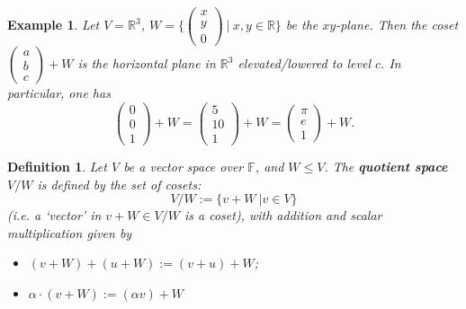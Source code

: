 \documentclass[12pt]{amsbook}
\newtheorem{definition}[theorem]{Definition}
\newtheorem{example}[theorem]{Example}
\begin{document}
\begin{example} \label{eg-xyplane}
    Let $V = \mathbb{R}^3$, $W = \{\begin{pmatrix} x \\ y \\ 0 \end{pmatrix}\ |\ x,y \in \mathbb{R}\}$ be the $xy$-plane. Then the coset
    $\begin{pmatrix} a \\ b \\ c \end{pmatrix} + W$ is the horizontal plane in $\mathbb{R}^3$ elevated/lowered to level $c$. In particular, one has
    $$\begin{pmatrix} 0 \\ 0 \\ 1 \end{pmatrix} + W = \begin{pmatrix} 5 \\ 10 \\ 1 \end{pmatrix} + W = \begin{pmatrix} \pi \\ e \\ 1 \end{pmatrix} + W.$$
\end{example}

\begin{definition}
    Let $V$ be a vector space over $\mathbb{F}$, and $W \leq V$. The {\bf quotient space} $V/W$ is defined by the set of cosets:
    $$V/W := \{v + W\ | v \in V\}$$
    (i.e. a `vector' in $v + W \in V/W$ is a coset), with addition and scalar multiplication given by
    \begin{itemize}
        \item $(v+W)+(u+W) := (v+u)+W$;
        \item $\alpha \cdot (v+W) := (\alpha v) + W$
    \end{itemize}
\end{definition}
\end{document}
